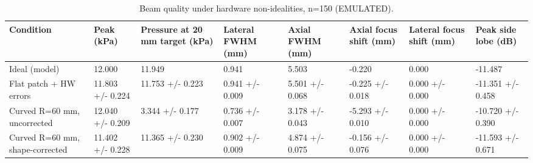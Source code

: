\begin{table}
\caption{Beam quality under hardware non-idealities, n=150 (EMULATED).}
\label{tab:T_E2_beam_mc}
\begin{tabular}{llllllll}
\toprule
Condition & Peak (kPa) & Pressure at 20 mm target (kPa) & Lateral FWHM (mm) & Axial FWHM (mm) & Axial focus shift (mm) & Lateral focus shift (mm) & Peak side lobe (dB) \\
\midrule
Ideal (model) & 12.000 & 11.949 & 0.941 & 5.503 & -0.220 & 0.000 & -11.487 \\
Flat patch + HW errors & 11.803 +/- 0.224 & 11.753 +/- 0.223 & 0.941 +/- 0.009 & 5.501 +/- 0.068 & -0.225 +/- 0.018 & 0.000 +/- 0.000 & -11.351 +/- 0.458 \\
Curved R=60 mm, uncorrected & 12.040 +/- 0.209 & 3.344 +/- 0.177 & 0.736 +/- 0.007 & 3.178 +/- 0.043 & -5.293 +/- 0.010 & 0.000 +/- 0.000 & -10.720 +/- 0.390 \\
Curved R=60 mm, shape-corrected & 11.402 +/- 0.228 & 11.365 +/- 0.230 & 0.902 +/- 0.009 & 4.874 +/- 0.075 & -0.156 +/- 0.076 & 0.000 +/- 0.000 & -11.593 +/- 0.671 \\
\bottomrule
\end{tabular}
\end{table}
